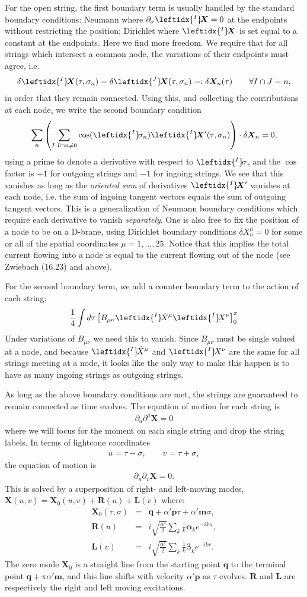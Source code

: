 \documentclass{revtex4}
\newcommand{\be}{\begin{eqnarray}}
\newcommand{\ee}{\end{eqnarray}}
\def\X{\bm{X}}
\def\L{\bm{\lambda}}
\def\p{\bm{p}}
\def\q{\bm{q}}
\def\a{\bm{a}}
\def\m{\bm{m}}
\def\b{\bm{b}}
\def\lI{\leftidx{^I} \! }
\def\lJ{\leftidx{^J} \! }
\def\L{\bm{L}}
\def\R{\bm{R}}
\def\a{\bm{\alpha}}
\def\b{\bm{\beta}}
\begin{document}
For the open string, the first boundary term is usually handled by the standard boundary conditions: Neumann where $\partial_\sigma \lI \X = 0$ at the endpoints without restricting the position; Dirichlet where $\lI \X$ is set equal to a constant at the endpoints. Here we find more freedom. We require that for all strings which intersect a common node, the variations of their endpoints must agree, i.e.
\be
\delta \lI \X(\tau, \sigma_n) = \delta \lJ \X(\tau, \sigma_n) =: \delta \X_n(\tau)  \qquad \forall I \cap J = n,
\ee
in order that they remain connected. Using this, and collecting the contributions at each node, we write the second boundary condition
\be
\label{BC2}
\sum_n \left( \sum_{I:I\cap n \ne 0} \cos(\lI \sigma_n) \lI \X'(\tau, \sigma_n)\right) \cdot \delta \X_n = 0,
\ee
using a prime to denote a derivative with respect to $\lI \sigma$, and the $\cos$ factor is $+1$ for outgoing strings and $-1$ for ingoing strings.
We see that this vanishes as long as the \textit{oriented sum} of derivatives $\lI \X'$ vanishes at each node, i.e. the sum of ingoing tangent vectors equals the sum of outgoing tangent vectors. This is a generalization of Neumann boundary conditions which require each derivative to vanish \textit{separately}. One is also free to fix the position of a node to be on a D-brane, using Dirichlet boundary conditions $\delta X^\mu_n = 0$ for some or all of the spatial coordinates $\mu = 1, \ldots, 25$. Notice that this implies the total current flowing into a node is equal to the current flowing out of the node (see Zwiebach (16.23) and above).

For the second boundary term, we add a counter boundary term to the action of each string:
\be
\frac{1}{4} \int d \tau \left[ B_{\mu \nu} \lI \dot{X}^\mu \lI X^\nu \right]_0^{\pi}
\ee
Under variations of $B_{\mu \nu}$ we need this to vanish. Since $B_{\mu \nu}$ must be single valued at a node, and because $\lI \dot{X}^\mu$ and $\lI X^\nu$ are the same for all strings meeting at a node, it looks like the only way to make this happen is to have as many ingoing strings as outgoing strings.

As long as the above boundary conditions are met, the strings are guaranteed to remain connected as time evolves. The equation of motion for each string is
\be
\partial_a \partial^a \X = 0
\ee
where we will focus for the moment on each single string and drop the string labels.
In terms of lightcone coordinates
\be
u = \tau - \sigma, \qquad v = \tau + \sigma,
\ee
the equation of motion is
\be
\partial_u \partial_v \X = 0.
\ee
This is solved by a superposition of right- and left-moving modes, $\X(u,v) = \X_0(u,v) + \R(u) + \L(v)$ where:
\be
\X_0(\tau, \sigma) &=& \q + \alpha' \p \tau + \alpha' \m \sigma, \\[3pt]
\R(u) &=& i \sqrt{\frac{\alpha'}{2}} \sum_k \frac{1}{k} \a_k e^{-iku}, \\
\L(v) &=& i \sqrt{\frac{\alpha'}{2}} \sum_k \frac{1}{k} \b_k e^{-ikv}.
\ee
The zero mode $\X_0$ is a straight line from the starting point $\q$ to the terminal point $\q + \pi \alpha' \m $, and this line shifts with velocity $\alpha' \p$ as $\tau$ evolves. $\R$ and $\L$ are respectively the right and left moving excitations.
\end{document}
